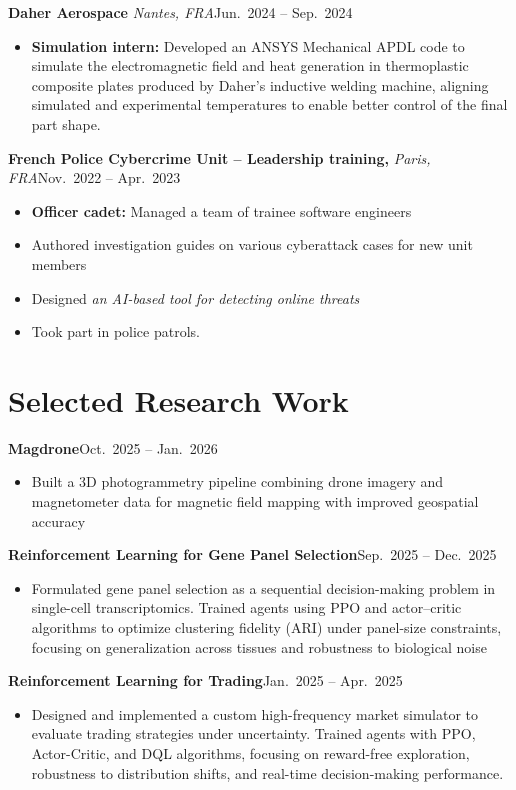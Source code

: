 \documentclass[10pt,letterpaper]{article}
\newcommand{\entry}[3]{%
  \vspace{1pt}\noindent\textbf{#1} \textit{#2}\hfill #3\par}
\newcommand{\subentry}[2]{%
  \vspace{1pt}\noindent\textbf{#1}\hfill #2\par}
\begin{document}
\entry{Daher Aerospace}{Nantes, FRA}{Jun.\ 2024 -- Sep.\ 2024}
\begin{itemize}
  \item \textbf{Simulation intern:} Developed an ANSYS Mechanical APDL code to simulate the electromagnetic field and heat generation in thermoplastic composite plates produced by Daher's inductive welding machine, aligning simulated and experimental temperatures to enable better control of the final part shape.
\end{itemize}

\entry{French Police Cybercrime Unit -- Leadership training,}{Paris, FRA}{Nov.\ 2022 -- Apr.\ 2023}
\begin{itemize}
  \item \textbf{Officer cadet:} Managed a team of trainee software engineers
  \item Authored investigation guides on various cyberattack cases for new unit members
  \item Designed \textit{an AI-based tool for detecting online threats}
  \item Took part in police patrols.
\end{itemize}

\section{Selected Research Work}

\subentry{Magdrone}{Oct.\ 2025 -- Jan.\ 2026}
\begin{itemize}
  \item Built a 3D photogrammetry pipeline combining drone imagery and magnetometer data for magnetic field mapping with improved geospatial accuracy
\end{itemize}

\subentry{Reinforcement Learning for Gene Panel Selection}{Sep.\ 2025 -- Dec.\ 2025}
\begin{itemize}
  \item Formulated gene panel selection as a sequential decision-making problem in single-cell transcriptomics. Trained agents using PPO and actor--critic algorithms to optimize clustering fidelity (ARI) under panel-size constraints, focusing on generalization across tissues and robustness to biological noise
\end{itemize}

\subentry{Reinforcement Learning for Trading}{Jan.\ 2025 -- Apr.\ 2025}
\begin{itemize}
  \item Designed and implemented a custom high-frequency market simulator to evaluate trading strategies under uncertainty. Trained agents with PPO, Actor-Critic, and DQL algorithms, focusing on reward-free exploration, robustness to distribution shifts, and real-time decision-making performance.
\end{itemize}
\end{document}
